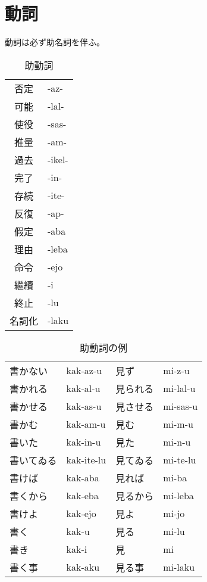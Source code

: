 \documentclass[]{jlreq}
\begin{document}
\section{動詞}

動詞は必ず助名詞を伴ふ。

\begin{table}[h]\centering
  \begin{tabular}{cl}
    否定   & -az-   \\
    可能   & -lal-  \\
    使役   & -sas-  \\
    推量   & -am-   \\
    過去   & -ikel- \\
    完了   & -in-   \\
    存続   & -ite-  \\
    反復   & -ap-   \\
    假定   & -aba   \\
    理由   & -leba  \\
    命令   & -ejo   \\
    繼續   & -i     \\
    終止   & -lu    \\
    名詞化 & -laku
  \end{tabular}
  \caption{助動詞}
\end{table}

\begin{table}[h]\centering
  \begin{tabular}{llll}
    書かない   & kak-az-u   & 見ず     & mi-z-u   \\
    書かれる   & kak-al-u   & 見られる & mi-lal-u \\
    書かせる   & kak-as-u   & 見させる & mi-sas-u \\
    書かむ     & kak-am-u   & 見む     & mi-m-u   \\
    書いた     & kak-in-u   & 見た     & mi-n-u   \\
    書いてゐる & kak-ite-lu & 見てゐる & mi-te-lu \\
    書けば     & kak-aba    & 見れば   & mi-ba    \\
    書くから   & kak-eba    & 見るから & mi-leba  \\
    書けよ     & kak-ejo    & 見よ     & mi-jo    \\
    書く       & kak-u      & 見る     & mi-lu    \\
    書き       & kak-i      & 見       & mi       \\
    書く事     & kak-aku    & 見る事   & mi-laku
  \end{tabular}
  \caption{助動詞の例}
\end{table}
\end{document}
